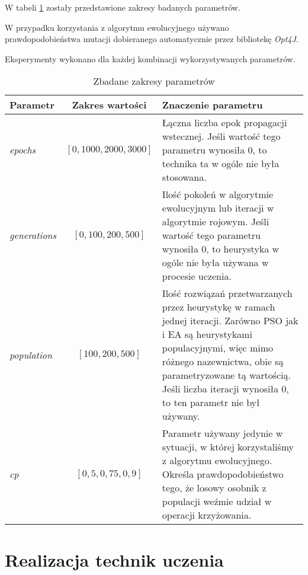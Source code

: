 \documentclass[11pt,a4paper,oneside]{report}
\begin{document}
W tabeli \ref{table:params} zostały przedstawione zakresy badanych parametrów.

W przypadku korzystania z algorytmu ewolucyjnego używano prawdopodobieństwa mutacji dobieranego automatycznie przez bibliotekę \emph{Opt4J}.

Eksperymenty wykonano dla każdej kombinacji wykorzystywanych parametrów.

\begin{table}[H]
	\caption{Zbadane zakresy parametrów \label{table:params}}
	\begin{tabularx}{\linewidth}{|l|c|X|}
		\hline
		\textbf{Parametr} & \textbf{Zakres wartości} & \textbf{Znaczenie parametru}\\
		\hline \hline
		\textit{epochs} & $[0, 1000, 2000, 3000]$ & Łączna liczba epok propagacji wstecznej\footnotemark[1]. Jeśli wartość tego parametru wynosiła 0, to technika ta w ogóle nie była stosowana. \\
		\hline
		\textit{generations} & $[0, 100, 200, 500]$ & Ilość pokoleń w algorytmie ewolucyjnym lub iteracji w algorytmie rojowym. Jeśli wartość tego parametru wynosiła 0, to heurystyka w ogóle nie była używana w procesie uczenia. \\
		\hline
		\textit{population} & $[100, 200, 500]$ &  Ilość rozwiązań przetwarzanych przez heurystykę w ramach jednej iteracji. Zarówno PSO jak i EA są heurystykami populacyjnymi, więc mimo różnego nazewnictwa, obie są parametryzowane tą wartością. Jeśli liczba iteracji wynosiła 0, to ten parametr nie był używany. \\
		\hline
		\textit{cp} & $[0,5, 0,75, 0,9]$	& Parametr używany jedynie w sytuacji, w której korzystaliśmy z algorytmu ewolucyjnego. Określa prawdopodobieństwo tego, że losowy osobnik z populacji weźmie udział w operacji krzyżowania. \\
		\hline
	\end{tabularx}
\end{table}


\section{Realizacja technik uczenia}
\end{document}
